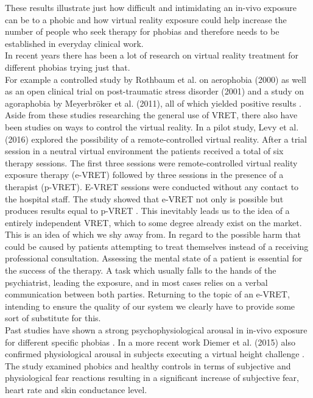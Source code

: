 These results illustrate just how difficult and intimidating an in-vivo exposure can be to a phobic and how virtual reality exposure could help increase the number of people who seek therapy for phobias and therefore needs to be established in everyday clinical work.\\
In recent years there has been a lot of research on virtual reality treatment for different phobias trying just that.\\
For example a controlled study by Rothbaum et al. on aerophobia (2000) as well as an open clinical trial on post-traumatic stress disorder (2001) and a study on agoraphobia by Meyerbröker et al. (2011), all of which yielded positive results \cite{ROTHBAUM2000} \cite{ROTHBAUM2001} \cite{MEYER2011}.
Aside from these studies researching the general use of VRET, there also have been studies on ways to control the virtual reality. In a pilot study, Levy et al. (2016) explored the possibility of a remote-controlled virtual reality. After a trial session in a neutral virtual environment the patients received a total of six therapy sessions. The first three sessions were remote-controlled virtual reality exposure therapy (e-VRET) followed by three sessions in the presence of a therapist (p-VRET). E-VRET sessions were conducted without any contact to the hospital staff. The study showed that e-VRET not only is possible but produces results equal to p-VRET \cite{LEVY2016}. This inevitably leads us to the idea of a entirely independent VRET, which to some degree already exist on the market. This is an idea of which we shy away from. In regard to the possible harm that could be caused by patients attempting to treat themselves instead of a receiving professional consultation.
Assessing the mental state of a patient is essential for the success of the therapy. A task which usually falls to the hands of the psychiatrist, leading the exposure, and in most cases relies on a verbal communication between both parties.
Returning to the topic of an e-VRET, intending to ensure the quality of our system we clearly have to provide some sort of substitute for this.\\
Past studies have shown a strong psychophysiological arousal in in-vivo exposure for different specific phobias \cite{NESSE1985} \cite{ALPERS2007}. In a more recent work Diemer et al. (2015) also confirmed physiological arousal in subjects executing a virtual height challenge \cite{DIEMER2016}. The study examined phobics and healthy controls in terms of subjective and physiological fear reactions resulting in a significant increase of subjective fear, heart rate and skin conductance level. 

